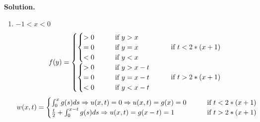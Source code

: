 \documentclass[a4paper]{book}
\newenvironment{solution}%
{\noindent\textbf{Solution.}}%
{\qedhere}
\numberwithin{equation}{chapter}
\theoremstyle{definition}
\begin{document}
\begin{solution}
\begin{enumerate}
  \item $-1 < x < 0$
    \[f(y) =
      \begin{aligned}
        \begin{cases}
         \begin{cases}
          > 0 \qquad &\textmd{if } y > x \\
          = 0   \qquad &\textmd{if } y = x \\
          < 0  \qquad &\textmd{if } y < x \\
        \end{cases}  \qquad &\textmd{if } t < 2 * (x+1)\\
        \begin{cases}
          > 0 \qquad &\textmd{if } y > x-t \\
          = 0   \qquad &\textmd{if } y = x-t \\
          < 0  \qquad &\textmd{if } y < x-t \\
        \end{cases}  \qquad &\textmd{if } t > 2 * (x+1)
        \end{cases}
      \end{aligned}
    \]
    \[w(x,t) =
      \begin{cases}
        \int_0^{x} g(s)ds \Rightarrow u(x,t)  = 0  \Rightarrow u(x,t) = g(x) = 0 \qquad &\textmd{if } t < 2 * (x+1) \\
        \frac{t}{2} + \int_0^{x-t} g(s)ds  \Rightarrow u(x,t) = g(x-t) = 1  \qquad &\textmd{if } t > 2 * (x+1) \\
      \end{cases}
    \]


\end{enumerate}
\end{solution}
\end{document}

